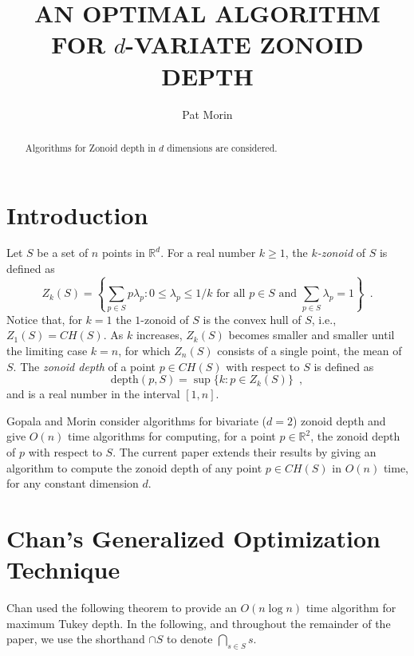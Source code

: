 \documentclass[lotsofwhite]{patmorin}
\title{\MakeUppercase{An Optimal Algorithm
	for} $d$\MakeUppercase{-Variate Zonoid Depth}}
\author{Pat Morin}
\date{}
\newcommand{\CH}{\mathit{CH}}
\newcommand{\Z}{\mathit{Z}}
\newcommand{\depth}{\mathrm{depth}}
\begin{document}
\maketitle
\begin{abstract}
Algorithms for Zonoid depth in $d$ dimensions are considered.
\end{abstract}

\section{Introduction}

Let $S$ be a set of $n$ points in $\mathbb{R}^d$.
For a real number $k\ge 1$, the \emph{$k$-zonoid} of $S$ is defined as 
\[
      \Z_k(S) = \left\{\sum_{p\in S}p\lambda_p 
	: \mbox{$0\le \lambda_p \le 1/k$ for all $p\in S$  
	   and $\sum_{p\in S}\lambda_p = 1$}  \right\} \enspace .
\] 
Notice that, for $k=1$ the $1$-zonoid of $S$ is the convex hull of
$S$,  i.e., $\Z_1(S)=\CH(S)$.
As $k$ increases, $\Z_k(S)$ becomes smaller and smaller until
the limiting case $k=n$, for which $\Z_n(S)$ consists of a single point,
the mean of $S$.  The \emph{zonoid depth} of a point
$p\in\CH(S)$ with respect to $S$ is defined as
\[
     \depth(p,S) = \sup\{k : p\in Z_k(S) \} \enspace ,
\]
and is a real number in the interval $[1,n]$.

Gopala and Morin \cite{gm06} consider algorithms for bivariate ($d=2$)
zonoid depth and give $O(n)$ time algorithms for computing, for a
point $p\in \mathbb{R}^2$, the zonoid depth of $p$ with respect to
$S$.  The current paper extends their results by giving an algorithm
to compute the zonoid depth of any point $p\in\CH(S)$ in $O(n)$ time,
for any constant dimension $d$.

\section{Chan's Generalized Optimization Technique}

Chan \cite{c2004} used the following theorem to provide an $O(n\log
n)$ time algorithm for maximum Tukey depth.  In the following, and
throughout the remainder of the paper, we use the shorthand $\cap S$
to denote $\bigcap_{s\in S}s$.
\end{document}
